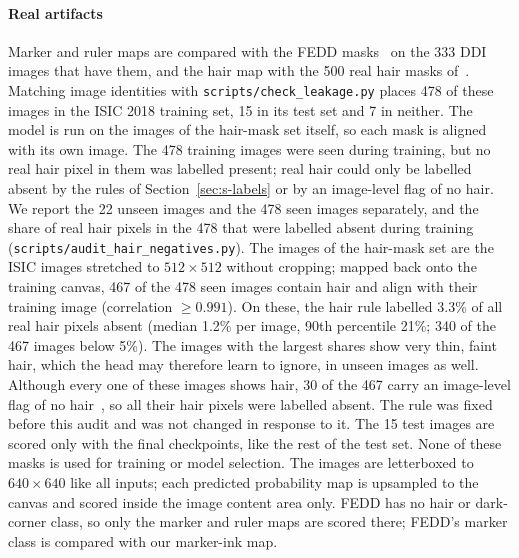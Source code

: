 \documentclass[10pt,a4paper]{article}
\begin{document}
\paragraph{Real artifacts}
Marker and ruler maps are compared with the FEDD masks~\cite{carrion2023fedd} on the 333 DDI images that have them, and the hair map with the 500 real hair masks of~\cite{hossain2023hairmask}. Matching image identities with \texttt{scripts/check\_leakage.py} places 478 of these images in the ISIC 2018 training set, 15 in its test set and 7 in neither. The model is run on the images of the hair-mask set itself, so each mask is aligned with its own image. The 478 training images were seen during training, but no real hair pixel in them was labelled present; real hair could only be labelled absent by the rules of Section~\ref{sec:s-labels} or by an image-level flag of no hair. We report the 22 unseen images and the 478 seen images separately, and the share of real hair pixels in the 478 that were labelled absent during training (\texttt{scripts/audit\_hair\_negatives.py}). The images of the hair-mask set are the ISIC images stretched to $512\times512$ without cropping; mapped back onto the training canvas, 467 of the 478 seen images contain hair and align with their training image (correlation $\ge0.991$). On these, the hair rule labelled 3.3\% of all real hair pixels absent (median 1.2\% per image, 90th percentile 21\%; 340 of the 467 images below 5\%). The images with the largest shares show very thin, faint hair, which the head may therefore learn to ignore, in unseen images as well. Although every one of these images shows hair, 30 of the 467 carry an image-level flag of no hair~\cite{bissoto2020debiasing}, so all their hair pixels were labelled absent. The rule was fixed before this audit and was not changed in response to it. The 15 test images are scored only with the final checkpoints, like the rest of the test set. None of these masks is used for training or model selection. The images are letterboxed to $640\times640$ like all inputs; each predicted probability map is upsampled to the canvas and scored inside the image content area only. FEDD has no hair or dark-corner class, so only the marker and ruler maps are scored there; FEDD's marker class is compared with our marker-ink map.
\end{document}
